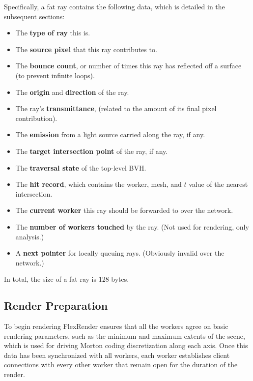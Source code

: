 \documentclass[a4paper,twoside]{article}
\begin{document}
Specifically, a fat ray contains the following data, which is detailed in the subsequent sections:

\begin{itemize}
    \item The \textbf{type of ray} this is.
    \item The \textbf{source pixel} that this ray contributes to.
    \item The \textbf{bounce count}, or number of times this ray has reflected
        off a surface (to prevent infinite loops).
    \item The \textbf{origin} and \textbf{direction} of the ray.
    \item The ray's \textbf{transmittance}, (related to the amount of its final
        pixel contribution).
    \item The \textbf{emission} from a light source carried along the ray, if
        any.
    \item The \textbf{target intersection point} of the ray, if any.
    \item The \textbf{traversal state} of the top-level BVH.
    \item The \textbf{hit record}, which contains the worker, mesh, and $t$
        value of the nearest intersection.
    \item The \textbf{current worker} this ray should be forwarded to over the
        network.
    \item The \textbf{number of workers touched} by the ray. (Not
        used for rendering, only analysis.)
    \item A \textbf{next pointer} for locally queuing rays. (Obviously invalid
        over the network.)
\end{itemize}

In total, the size of a fat ray is 128 bytes.

\subsection{Render Preparation}
\label{prep}

To begin rendering FlexRender ensures that all the workers agree on basic rendering
parameters, such as the minimum and maximum extents of the scene, which is used
for driving Morton coding discretization along each axis. Once this data has
been synchronized with all workers, each worker establishes client connections
with every other worker that remain open for the duration of the render.
\end{document}
